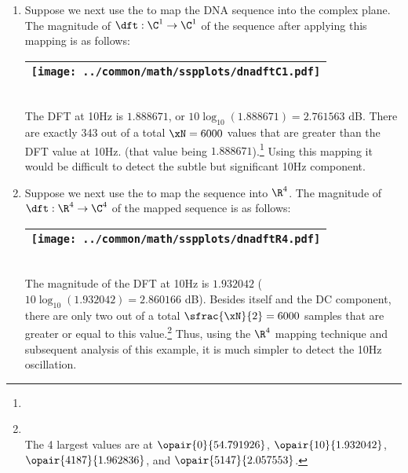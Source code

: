 \begin{example}
\begin{enumerate}
  \item \label{item:nonstatdna_C1qpsk}
    Suppose we next use the   to map
    the DNA sequence into the complex plane.
    The magnitude of $\dft:\C^1\to\C^1$ of the sequence after applying this mapping is as follows:
    \\\begin{tabular}{|>{\scs}c|}
         \hline
         \texttt{[image: ../common/math/sspplots/dnadftC1.pdf]}%
       \\\hline
    \end{tabular}\\
    The DFT at 10Hz is $1.888671$, or $10\log_{10}(1.888671)=2.761563$ dB.
    There are exactly 343 out of a total $\xN=6000$ values that are greater than the DFT value at 10Hz.
    (that value being $1.888671$).\footnote{}
    Using this mapping it would be difficult to detect the subtle but significant 10Hz component.
     
  \item \label{item:nonstatdna_R4}
    Suppose we next use the   to map
    the sequence into $\R^4$.
    The magnitude of $\dft:\R^4\to\C^4$ of the mapped sequence is as follows:
     \\\begin{tabular}{|>{\scs}c|}
          \hline
          \texttt{[image: ../common/math/sspplots/dnadftR4.pdf]}%
        \\\hline
     \end{tabular}\\
     The magnitude of the DFT at 10Hz is $1.932042$ ($10\log_{10}(1.932042)=2.860166$ dB).
     Besides itself and the DC component, there are only two out of a total $\sfrac{\xN}{2}=6000$ samples
     that are greater or equal to this value.\footnote{
      \\
       The 4 largest values are at
         $\opair{   0}{54.791926}$, 
         $\opair{  10}{ 1.932042}$, 
         $\opair{4187}{ 1.962836}$, and 
         $\opair{5147}{ 2.057553}$.
       } 
     Thus, using the $\R^4$ mapping technique and subsequent analysis of this example, 
     it is much simpler to detect the 10Hz oscillation.
\end{enumerate}
\end{example}

